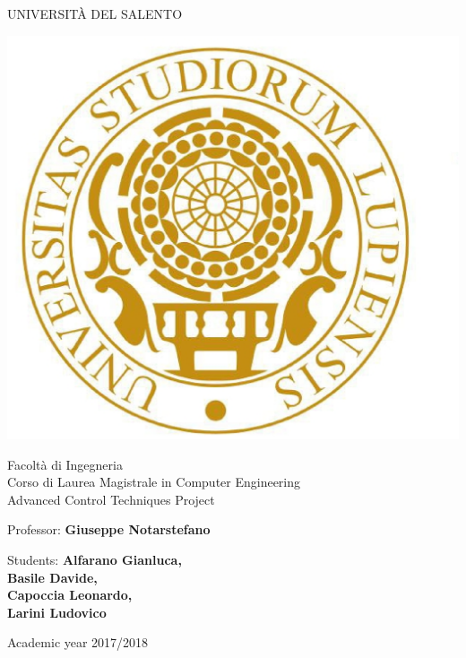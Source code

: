 \thispagestyle{empty}                                                 
\begin{center}                                                            
    \vspace{5mm}                                                           
 {\LARGE UNIVERSIT\`A DEL SALENTO} \\                       
      \vspace{5mm}
\end{center}
\begin{center}
{\includegraphics[scale=.20]{figs/logo_unisalento}}      
\end{center}
\begin{center}
      \vspace{5mm}
      {\LARGE Facolt\`a di Ingegneria} \\
        \vspace{3mm}
      {\Large Corso di Laurea Magistrale in Computer Engineering} \\
      \vspace{20mm}
      {\LARGE Advanced Control Techniques Project} \\
      \vspace{15mm}
\end{center}
\begin{flushleft}                                                                              
     {\large Professor: \textbf{\@ Giuseppe Notarstefano}} \\        
      \vspace{13mm}
\end{flushleft}
\begin{flushright}
      {\large Students: \textbf{\@ Alfarano Gianluca,\\ Basile Davide,\\ Capoccia Leonardo,\\ Larini Ludovico}}\\
\end{flushright}        %
\begin{center}
\vfill
      {\large Academic year \@ 2017/2018} \\
\end{center}
